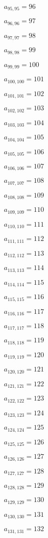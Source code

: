 \documentclass[a4paper,12pt]{article}
\begin{document}
$a _{ 95, 95 } = 96$

$a _{ 96, 96 } = 97$

$a _{ 97, 97 } = 98$

$a _{ 98, 98 } = 99$

$a _{ 99, 99 } = 100$

$a _{ 100, 100 } = 101$

$a _{ 101, 101 } = 102$

$a _{ 102, 102 } = 103$

$a _{ 103, 103 } = 104$

$a _{ 104, 104 } = 105$

$a _{ 105, 105 } = 106$

$a _{ 106, 106 } = 107$

$a _{ 107, 107 } = 108$

$a _{ 108, 108 } = 109$

$a _{ 109, 109 } = 110$

$a _{ 110, 110 } = 111$

$a _{ 111, 111 } = 112$

$a _{ 112, 112 } = 113$

$a _{ 113, 113 } = 114$

$a _{ 114, 114 } = 115$

$a _{ 115, 115 } = 116$

$a _{ 116, 116 } = 117$

$a _{ 117, 117 } = 118$

$a _{ 118, 118 } = 119$

$a _{ 119, 119 } = 120$

$a _{ 120, 120 } = 121$

$a _{ 121, 121 } = 122$

$a _{ 122, 122 } = 123$

$a _{ 123, 123 } = 124$

$a _{ 124, 124 } = 125$

$a _{ 125, 125 } = 126$

$a _{ 126, 126 } = 127$

$a _{ 127, 127 } = 128$

$a _{ 128, 128 } = 129$

$a _{ 129, 129 } = 130$

$a _{ 130, 130 } = 131$

$a _{ 131, 131 } = 132$
\end{document}
